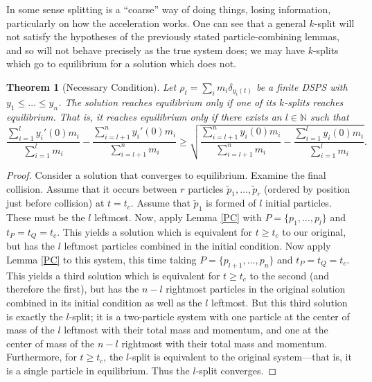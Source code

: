 \documentclass[11pt]{article}
\newtheorem{theorem}{Theorem}[section]
\numberwithin{equation}{section}
\begin{document}
            In some sense splitting is a ``coarse'' way of doing things, losing information, particularly on how the acceleration works. One can see that a general $k$-split will not satisfy the hypotheses of the previously stated particle-combining lemmas, and so will not behave precisely as the true system does; we may have $k$-splits which go to equilibrium for a solution which does not. 
    
        \begin{theorem}[Necessary Condition]\label{discrete-necessary}
            Let $\rho_t=\sum_i m_i\delta_{y_i(t)}$ be a finite DSPS with $y_1\leq\ldots\leq y_n$. The solution reaches equilibrium only if one of its $k$-splits reaches equilibrium. That is, it reaches equilibrium only if there exists an $l\in\mathbb{N}$ such that $$\frac{\sum_{i=1}^ly_i'(0)m_i}{\sum_{i=1}^l m_i}-\frac{\sum_{i=l+1}^ny_i'(0)m_i}{\sum_{i=l+1}^n m_i}\geq\sqrt{\frac{\sum_{i=l+1}^ny_i(0)m_i}{\sum_{i=l+1}^n m_i}-\frac{\sum_{i=1}^l y_i(0)m_i}{\sum_{i=1}^l m_i}}.$$
        \end{theorem}

        \begin{proof}
            Consider a solution that converges to equilibrium. Examine the final collision. Assume that it occurs between $r$ particles $\tilde p_1, \ldots , \tilde p_r$ (ordered by position just before collision) at $t=t_c$. Assume that $\tilde p_1$ is formed of $l$ initial particles. These must be the $l$ leftmost. Now, apply Lemma \ref{PC} with $P = \{p_1, \ldots ,p_l\}$ and $t_P=t_Q=t_c$. This yields a solution which is equivalent for $t \ge t_c$ to our original, but has the $l$ leftmost particles combined in the initial condition. Now apply Lemma \ref{PC} to this system, this time taking $P=\{p_{l+1}, \ldots , p_n\}$ and $t_P=t_Q=t_c$. This yields a third solution which is equivalent for $t \ge t_c$ to the second (and therefore the first), but has the $n-l$ rightmost particles in the original solution combined in its initial condition as well as the $l$ leftmost. But this third solution is exactly the $l$-split; it is a two-particle system with one particle at the center of mass of the $l$ leftmost with their total mass and momentum, and one at the center of mass of the $n-l$ rightmost with their total mass and momentum. Furthermore, for $t \ge t_c$, the $l$-split is equivalent to the original system—that is, it is a single particle in equilibrium. Thus the $l$-split converges.
        \end{proof}
        
\end{document}
